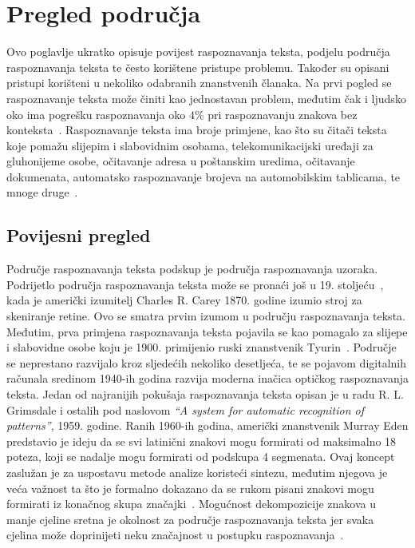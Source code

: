 \chapter{Pregled područja}
\label{ch:pregled-podrucja}
Ovo poglavlje ukratko opisuje povijest raspoznavanja teksta, podjelu područja raspoznavanja teksta te često korištene
pristupe problemu. Također su opisani pristupi korišteni u nekoliko odabranih znanstvenih članaka. Na prvi pogled se
raspoznavanje teksta može činiti kao jednostavan problem, međutim čak i ljudsko oko ima pogrešku raspoznavanja oko $4\%$
pri raspoznavanju znakova bez konteksta\ \citep{mantas1986}. Raspoznavanje teksta ima broje primjene, kao što su čitači
teksta koje pomažu slijepim i slabovidnim osobama, telekomunikacijski uređaji za gluhonijeme osobe, očitavanje adresa u
poštanskim uredima, očitavanje dokumenata, automatsko raspoznavanje brojeva na automobilskim tablicama, te mnoge
druge\ \citep{govindan1989}.


\section{Povijesni pregled}
\label{sec:povijesni-pregled}
Područje raspoznavanja teksta podskup je područja raspoznavanja uzoraka. Podrijetlo područja raspoznavanja teksta može
se pronaći još u 19. stoljeću\ \citep{mantas1986}, kada je američki izumitelj Charles R. Carey 1870. godine izumio stroj
za skeniranje retine. Ovo se smatra prvim izumom u području raspoznavanja teksta. Međutim, prva primjena raspoznavanja
teksta pojavila se kao pomagalo za slijepe i slabovidne osobe koju je 1900. primijenio ruski znanstvenik
Tyurin\ \citep{govindan1989}. Područje se neprestano razvijalo kroz sljedećih nekoliko desetljeća, te se pojavom
digitalnih računala sredinom 1940-ih godina razvija moderna inačica optičkog raspoznavanja teksta. Jedan od najranijih
pokušaja raspoznavanja teksta opisan je u radu R. L. Grimsdale i ostalih pod naslovom
\emph{``A system for automatic recognition of patterns''}, 1959. godine. Ranih 1960-ih godina, američki znanstvenik
Murray Eden predstavio je ideju da se svi latinični znakovi mogu formirati od maksimalno 18 poteza, koji se nadalje mogu
formirati od podskupa 4 segmenata. Ovaj koncept zaslužan je za uspostavu metode analize koristeći sintezu, međutim
njegova je veća važnost ta što je formalno dokazano da se rukom pisani znakovi mogu formirati iz konačnog skupa
značajki\ \citep{mantas1986}. Mogućnost dekompozicije znakova u manje cjeline sretna je okolnost za područje
raspoznavanja teksta jer svaka cjelina može doprinijeti neku značajnost u postupku raspoznavanja\ \citep{mori1999}.


